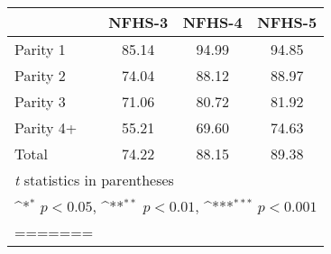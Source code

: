 {
\def\sym#1{\ifmmode^{#1}\else\(^{#1}\)\fi}
\begin{tabular}{l*{3}{c}}
\toprule
            &\multicolumn{1}{c}{NFHS-3}&\multicolumn{1}{c}{NFHS-4}&\multicolumn{1}{c}{NFHS-5}\\
\midrule
\midrule
Parity 1    &       85.14         &       94.99         &       94.85         \\
Parity 2    &       74.04         &       88.12         &       88.97         \\
Parity 3    &       71.06         &       80.72         &       81.92         \\
Parity 4+   &       55.21         &       69.60         &       74.63         \\
Total       &       74.22         &       88.15         &       89.38         \\
\bottomrule
\multicolumn{4}{l}{\footnotesize \textit{t} statistics in parentheses}\\
\multicolumn{4}{l}{\footnotesize \sym{*} \(p<0.05\), \sym{**} \(p<0.01\), \sym{***} \(p<0.001\)}\\
=======
\hline\hline

\end{tabular}
}
